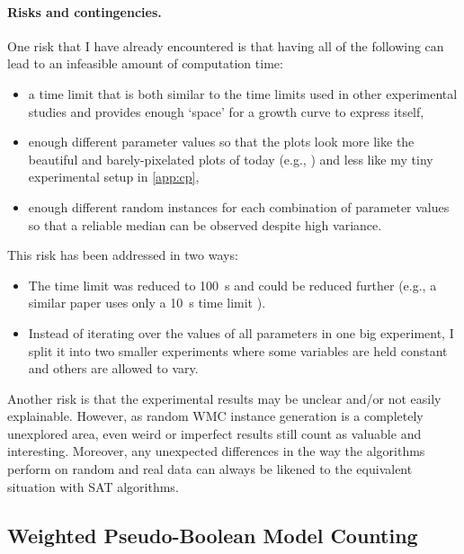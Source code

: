 \documentclass{article}
\begin{document}
\paragraph{Risks and contingencies.} One risk that I have already encountered is
that having all of the following can lead to an infeasible amount of computation
time:
\begin{itemize}
\item a time limit that is both similar to the time limits used in other
  experimental studies and provides enough `space' for a growth curve to express
  itself,
\item enough different parameter values so that the plots look more like the
  beautiful and barely-pixelated plots of today (e.g.,
  \cite{DBLP:conf/cp/McCreeshPP19,DBLP:journals/jair/McCreeshPST18}) and less
  like my tiny experimental setup in \cref{app:cp},
\item enough different random instances for each combination of parameter values
  so that a reliable median can be observed despite high variance.
\end{itemize}
This risk has been addressed in two ways:
\begin{itemize}
\item The time limit was reduced to \SI{100}{\second} and could be reduced
  further (e.g., a similar paper uses only a \SI{10}{\second} time limit
  \cite{DBLP:conf/ijcai/DudekMV17}).
\item Instead of iterating over the values of all parameters in one big
  experiment, I split it into two smaller experiments where some variables are
  held constant and others are allowed to vary.
\end{itemize}
Another risk is that the experimental results may be unclear and/or not easily
explainable. However, as random WMC instance generation is a completely
unexplored area, even weird or imperfect results still count as valuable and
interesting. Moreover, any unexpected differences in the way the algorithms
perform on random and real data can always be likened to the equivalent
situation with SAT algorithms.

\subsection{Weighted Pseudo-Boolean Model Counting} \label{sec:2}
\end{document}

